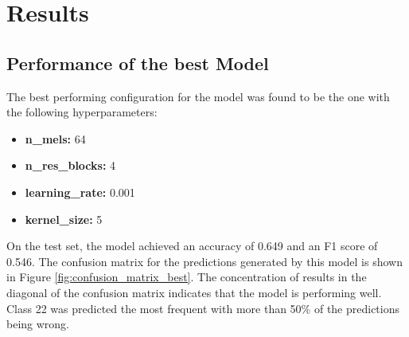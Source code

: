 


\section{Results}
\label{section3}

\subsection{Performance of the best Model}%

The best performing configuration for the model was found to be the one with the following hyperparameters:

\begin{itemize}
    \item \textbf{n\_mels:} 64
    \item \textbf{n\_res\_blocks:} 4
    \item \textbf{learning\_rate:} 0.001
    \item \textbf{kernel\_size:} 5
\end{itemize}

On the test set, the model achieved an accuracy of 0.649 and an F1 score of 0.546. 
The confusion matrix for the predictions generated by this model is shown in Figure \ref{fig:confusion_matrix_best}.
The concentration of results in the diagonal of the confusion matrix indicates that the model is performing well.
Class 22 was predicted the most frequent with more than 50\% of the predictions being wrong.

